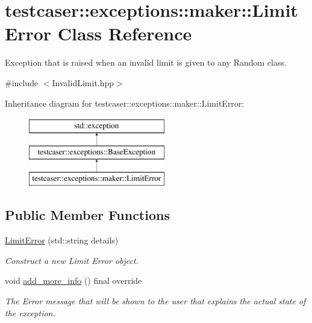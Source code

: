 \hypertarget{classtestcaser_1_1exceptions_1_1maker_1_1LimitError}{}\section{testcaser\+:\+:exceptions\+:\+:maker\+:\+:Limit\+Error Class Reference}
\label{classtestcaser_1_1exceptions_1_1maker_1_1LimitError}


Exception that is raised when an invalid limit is given to any Random class.  




{\ttfamily \#include $<$Invalid\+Limit.\+hpp$>$}

Inheritance diagram for testcaser\+:\+:exceptions\+:\+:maker\+:\+:Limit\+Error\+:\begin{figure}[H]
\begin{center}
\leavevmode
\includegraphics[height=3.000000cm]{classtestcaser_1_1exceptions_1_1maker_1_1LimitError}
\end{center}
\end{figure}
\subsection*{Public Member Functions}
\begin{DoxyCompactItemize}
\item 
\mbox{\hyperlink{classtestcaser_1_1exceptions_1_1maker_1_1LimitError_a93442165f498e8910b4c2170a05d3b3a}{Limit\+Error}} (std\+::string details)
\begin{DoxyCompactList}\small\item\em Construct a new Limit Error object. \end{DoxyCompactList}\item 
void \mbox{\hyperlink{classtestcaser_1_1exceptions_1_1maker_1_1LimitError_adb0f0c92f0d78b26f4310301f97bff3a}{add\+\_\+more\+\_\+info}} () final override
\begin{DoxyCompactList}\small\item\em The Error message that will be shown to the user that explains the actual state of the exception. \end{DoxyCompactList}\end{DoxyCompactItemize}
